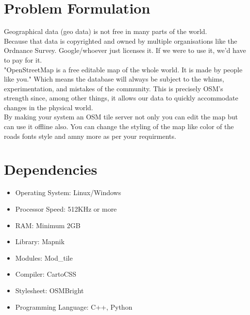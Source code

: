 \section{Problem Formulation}
Geographical data (geo data) is not free in many parts of the world.\\
Because that data is copyrighted and owned by multiple organisations like the Ordnance Survey. Google/whoever just licenses it. If we were to use it, we'd have to pay for it. \\
\noindent "OpenStreetMap is a free editable map of the whole world. It is made by people like you." Which means the database will always be subject to the whims, experimentation, and mistakes of the community. This is precisely OSM's strength since, among other things, it allows our data to quickly accommodate changes in the physical world.\\
\noindent By making your system an OSM tile server not only you can edit the map but can use it offline also. You can change the styling of the map like color of the roads fonts style and amny more as per your requirments. 


\section{Dependencies}
\begin{itemize}
\item Operating System: Linux/Windows
\item Processor Speed: 512KHz or more
\item RAM: Minimum 2GB
\item Library: Mapnik
\item Modules: Mod\_tile
\item Compiler: CartoCSS
\item Stylesheet: OSMBright
\item Programming Language: C++, Python
\end{itemize}


